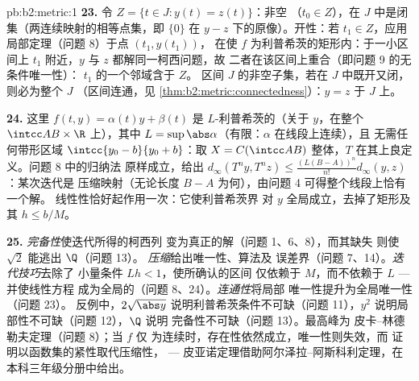 \begin{solution}{pb:b2:metric:1}
\textbf{23.} 令 $Z = \{t \in J : y(t) = z(t)\}$：非空
（$t_0 \in Z$），在 $J$ 中是闭集（两连续映射的相等点集，即
$\{0\}$ 在 $y - z$ 下的原像）。开性：若 $t_1 \in Z$，应用
局部定理（问题 8）于点 $(t_1, y(t_1))$，
在使 $f$ 为利普希茨的矩形内：于一小区间上
$t_1$ 附近，$y$ 与 $z$ 都解同一柯西问题，故
二者在该区间上重合（即问题 9 的无条件唯一性）：
$t_1$ 的一个邻域含于 $Z$。
区间 $J$ 的非空子集，若在 $J$ 中既开又闭，则必为整个 $J$
（区间连通，见
\cref{thm:b2:metric:connectedness}）：$y = z$ 于 $J$ 上。

\textbf{24.} 这里 $f(t, y) = \alpha(t)y + \beta(t)$ 是
$L$-利普希茨的（关于 $y$，在整个 $\intcc AB \times \R$ 上），其中 $L =
\sup\abs\alpha$（有限：$\alpha$ 在线段上连续），且
无需任何带形区域 $\intcc{y_0 - b}{y_0 + b}$：取 $X = C(\intcc
AB)$ 整体，$T$ 在其上良定义。问题 8 中的归纳法
原样成立，给出 $d_\infty(T^ny, T^nz) \leq
\frac{(L(B - A))^n}{n!}d_\infty(y, z)$：某次迭代是
压缩映射（无论长度 $B - A$ 为何），由问题 4
可得整个线段上恰有一个解。
线性性恰好起作用一次：它使利普希茨界
对 $y$ 全局成立，去掉了矩形及其 $h \leq b/M$。

\textbf{25.} \emph{完备性}使迭代所得的柯西列
变为真正的解（问题 1、6、8），而其缺失
则使 $\sqrt2$ 能逃出 $\Q$（问题 13）。
\emph{压缩}给出唯一性、算法及
误差界（问题 7、14）。\emph{迭代技巧}去除了
小量条件 $Lh < 1$，使所确认的区间
仅依赖于 $M$，而不依赖于 $L$ --- 并使线性方程
成为全局的（问题 8、24）。\emph{连通性}将局部
唯一性提升为全局唯一性（问题 23）。
反例中，$2\sqrt{\abs y}$ 说明利普希茨条件不可缺（问题
11），$y^2$ 说明局部性不可缺（问题 12），$\Q$ 说明
完备性不可缺（问题 13）。最高峰为
皮卡--林德勒夫定理（问题 8）；当 $f$ 仅
为连续时，存在性依然成立，唯一性则失效，而
证明以函数集的紧性取代压缩性，
--- 皮亚诺定理借助阿尔泽拉--阿斯科利定理，在
本科三年级分册中给出。
\end{solution}
